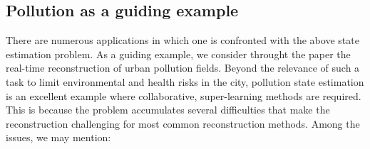 \documentclass[11pt,a4paper,twoside]{article}
\theoremstyle{definition}
\numberwithin{equation}{section}
\newcommand{\<}{\langle}
\renewcommand{\>}{\rangle}
\begin{document}
\subsection{Pollution as a guiding example}
There are numerous applications in which one is confronted with the above state estimation problem. As a guiding example, we consider throught the paper the real-time reconstruction of urban pollution fields. Beyond the relevance of such a task to limit environmental and health risks in the city, pollution state estimation is an excellent example where collaborative, super-learning methods are required. This is because the problem accumulates several difficulties that make the reconstruction challenging for most common reconstruction methods. Among the issues, we may mention:




\end{document}
